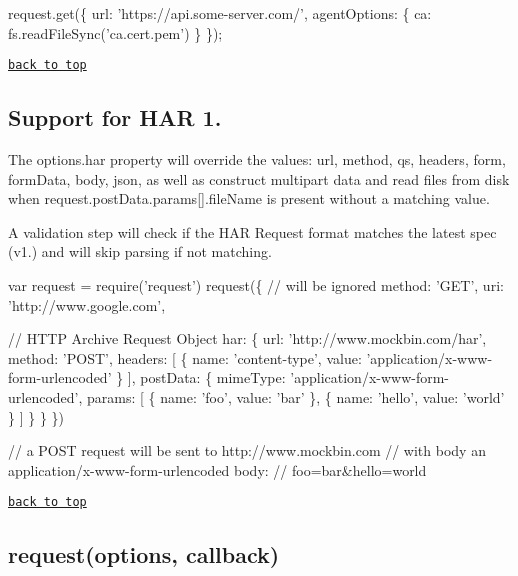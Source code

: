 \begin{DoxyCode}
request.get(\{
    url: 'https://api.some-server.com/',
    agentOptions: \{
        ca: fs.readFileSync('ca.cert.pem')
    \}
\});
\end{DoxyCode}


\href{#table-of-contents}{\tt back to top}





\subsection*{Support for H\+AR 1.}

The {\ttfamily options.\+har} property will override the values\+: {\ttfamily url}, {\ttfamily method}, {\ttfamily qs}, {\ttfamily headers}, {\ttfamily form}, {\ttfamily form\+Data}, {\ttfamily body}, {\ttfamily json}, as well as construct multipart data and read files from disk when {\ttfamily request.\+post\+Data.\+params\mbox{[}\mbox{]}.file\+Name} is present without a matching {\ttfamily value}.

A validation step will check if the H\+AR Request format matches the latest spec (v1.) and will skip parsing if not matching.


\begin{DoxyCode}
var request = require('request')
request(\{
  // will be ignored
  method: 'GET',
  uri: 'http://www.google.com',

  // HTTP Archive Request Object
  har: \{
    url: 'http://www.mockbin.com/har',
    method: 'POST',
    headers: [
      \{
        name: 'content-type',
        value: 'application/x-www-form-urlencoded'
      \}
    ],
    postData: \{
      mimeType: 'application/x-www-form-urlencoded',
      params: [
        \{
          name: 'foo',
          value: 'bar'
        \},
        \{
          name: 'hello',
          value: 'world'
        \}
      ]
    \}
  \}
\})

// a POST request will be sent to http://www.mockbin.com
// with body an application/x-www-form-urlencoded body:
// foo=bar&hello=world
\end{DoxyCode}


\href{#table-of-contents}{\tt back to top}





\subsection*{request(options, callback)}

